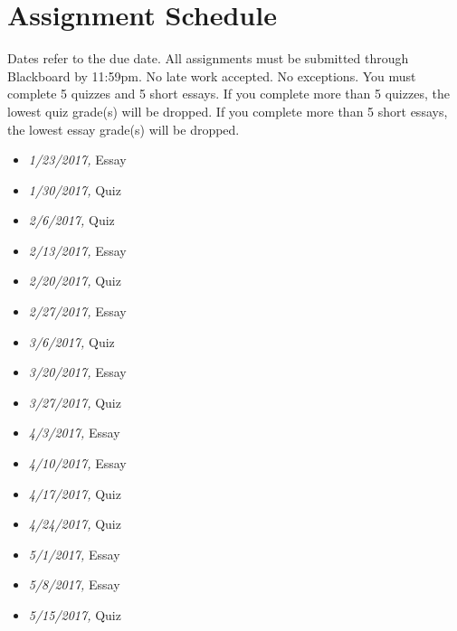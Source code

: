 \documentclass[article,oneside]{memoir}
\begin{document}
\section{ Assignment Schedule}
Dates refer to the due date. All assignments must be submitted through Blackboard by 11:59pm. No late work accepted. No exceptions. You must complete 5 quizzes and 5 short essays. If you complete more than 5 quizzes, the lowest quiz grade(s) will be dropped. If you complete more than 5 short essays, the lowest essay grade(s) will be dropped. 
\begin{itemize}
\item \textit{1/23/2017,} Essay 
\item \textit{1/30/2017,} Quiz 
\item \textit{2/6/2017,} Quiz
\item \textit{2/13/2017,} Essay 
\item \textit{2/20/2017,} Quiz 
\item \textit{2/27/2017,} Essay 
\item \textit{3/6/2017,}  Quiz 
\item \textit{3/20/2017,} Essay 
\item \textit{3/27/2017,}  Quiz 
\item \textit{4/3/2017,} Essay 
\item \textit{4/10/2017,} Essay 
\item \textit{4/17/2017,} Quiz
\item \textit{4/24/2017,} Quiz 
\item \textit{5/1/2017,} Essay 
\item \textit{5/8/2017,} Essay 
\item \textit{5/15/2017,} Quiz  
\end{itemize}




\end{document}
